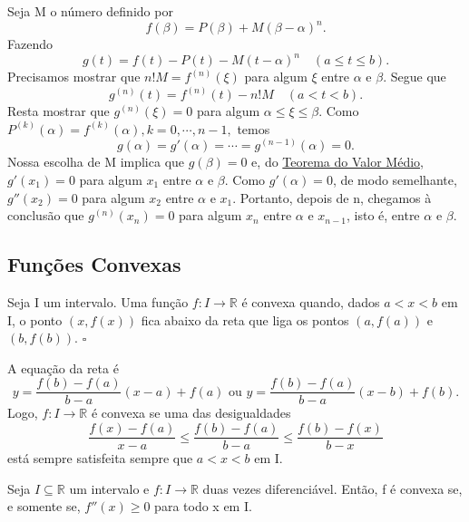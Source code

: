 \documentclass[analysis_notes.tex]{subfiles}
\begin{document}
\begin{proof*}
	Seja M o número definido por
	\[
		f(\beta ) = P(\beta ) + M(\beta -\alpha )^{n}.
	\]
	Fazendo
	\[
		g(t) = f(t) - P(t) - M(t-\alpha )^{n}\quad (a\leq t\leq b).
	\]
	Precisamos mostrar que \(n!M = f^{(n)}(\xi)\) para algum \(\xi\) entre
	\(\alpha \) e \(\beta \). Segue que
	\[
		g^{(n)}(t) = f^{(n)}(t) - n!M\quad (a < t < b).
	\]
	Resta mostrar que \(g^{(n)}(\xi) = 0\) para algum \(\alpha \leq \xi\leq \beta .\)
	Como \(P^{(k)}(\alpha ) = f^{(k)}(\alpha ), k=0, \cdots, n-1,\) temos
	\[
		g(\alpha ) = g'(\alpha ) = \cdots = g^{(n-1)}(\alpha ) = 0.
	\]
	Nossa escolha de M implica que \(g(\beta ) = 0\) e, do \hyperlink{mean_value}{Teorema
		do Valor Médio,} \(g'(x_{1}) = 0\) para algum \(x_{1}\) entre \(\alpha \) e \(\beta \).
	Como \(g'(\alpha ) = 0\), de modo semelhante, \(g''(x_{2}) = 0\) para algum
	\(x_{2}\) entre \(\alpha \) e \(x_{1} \). Portanto, depois de n, chegamos à conclusão
	que \(g^{(n)}(x_{n}) = 0\) para algum \(x_{n}\) entre \(\alpha \) e \(x_{n-1}\), isto é,
	entre \(\alpha \) e \(\beta \). \qedsymbol
\end{proof*}
\subsection{Fun\c cões Convexas}
\begin{def*}
	Seja I um intervalo. Uma fun\c cão \(f:I\rightarrow \mathbb{R}\) é convexa quando,
	dados \(a < x < b\) em I, o ponto \((x, f(x))\) fica abaixo da reta que
	liga os pontos \((a, f(a))\) e \((b, f(b))\). \(\square\)
\end{def*}
A equa\c cão da reta é
\[
	y = \frac{f(b)-f(a)}{b-a}(x-a)+f(a) \text{ ou } y = \frac{f(b)-f(a)}{b-a}(x-b)+f(b).
\]
Logo, \(f:I\rightarrow \mathbb{R}\) é convexa se uma das desigualdades
\[
	\frac{f(x) - f(a)}{x-a}\leq \frac{f(b) - f(a)}{b-a}\leq \frac{f(b)-f(x)}{b-x}
\]
está sempre satisfeita sempre que \(a < x < b\) em I.
\hypertarget{convex_characterization}{ \begin{theorem*}
		Seja \(I\subseteq{\mathbb{R}}\) um intervalo e \(f:I\rightarrow \mathbb{R}\) duas vezes diferenciável.
		Então, f é convexa se, e somente se, \(f''(x)\geq 0\) para todo x em I.
	\end{theorem*}}
\end{document}
